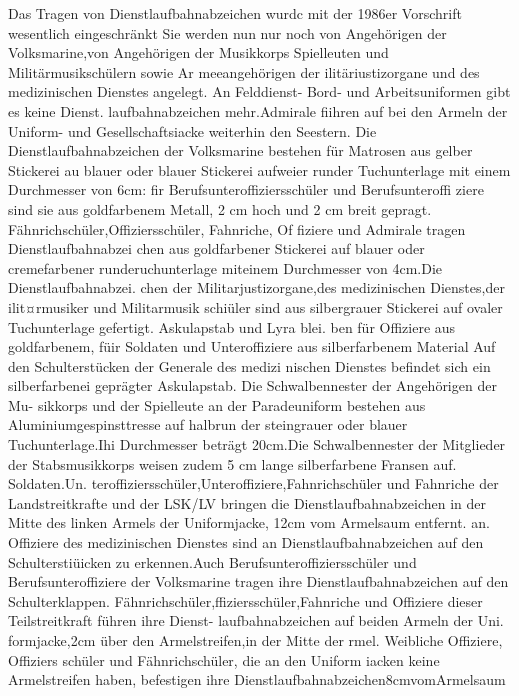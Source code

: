 Das Tragen von Dienstlaufbahnabzeichen wurdc
mit der 1986er Vorschrift wesentlich eingeschränkt
Sie werden nun nur noch von Angehörigen der
Volksmarine,von Angehörigen der Musikkorps
Spielleuten und Militärmusikschülern sowie Ar
meeangehörigen der ilitäriustizorgane und des
medizinischen Dienstes angelegt. An Felddienst-
Bord- und Arbeitsuniformen gibt es keine Dienst.
laufbahnabzeichen mehr.Admirale fiihren auf bei
den Armeln der Uniform- und Gesellschaftsiacke
weiterhin den Seestern.
Die Dienstlaufbahnabzeichen der Volksmarine
bestehen für Matrosen aus gelber Stickerei au
blauer oder blauer Stickerei aufweier runder
Tuchunterlage mit einem Durchmesser von 6cm:
fir Berufsunteroffiziersschüler und Berufsunteroffi
ziere sind sie aus goldfarbenem Metall, 2 cm hoch
und 2 cm breit gepragt.
Fähnrichschüler,Offiziersschüler, Fahnriche, Of
fiziere und Admirale tragen Dienstlaufbahnabzei
chen aus goldfarbener Stickerei auf blauer oder
cremefarbener runderuchunterlage miteinem
Durchmesser von 4cm.Die Dienstlaufbahnabzei.
chen der Militarjustizorgane,des medizinischen
Dienstes,der ilit¤rmusiker und Militarmusik
schiüler sind aus silbergrauer Stickerei auf ovaler
Tuchunterlage gefertigt. Askulapstab und Lyra blei.
ben für Offiziere aus goldfarbenem, füir Soldaten
und Unteroffiziere aus silberfarbenem Material
Auf den Schulterstücken der Generale des medizi
nischen Dienstes befindet sich ein silberfarbenei
geprägter Askulapstab.
Die Schwalbennester der Angehörigen der Mu-
sikkorps und der Spielleute an der Paradeuniform
bestehen aus Aluminiumgespinsttresse auf halbrun
der steingrauer oder blauer Tuchunterlage.Ihi
Durchmesser beträgt 20cm.Die Schwalbennester der Mitglieder der Stabsmusikkorps weisen zudem
5 cm lange silberfarbene Fransen auf. Soldaten.Un.
teroffiziersschüler,Unteroffiziere,Fahnrichschüler
und Fahnriche der Landstreitkrafte und der
LSK/LV bringen die Dienstlaufbahnabzeichen in
der Mitte des linken Armels der Uniformjacke,
12cm vom Armelsaum entfernt. an.
Offiziere des medizinischen Dienstes sind an
Dienstlaufbahnabzeichen auf den Schulterstiüicken
zu erkennen.Auch Berufsunteroffiziersschüler und
Berufsunteroffiziere der Volksmarine tragen ihre
Dienstlaufbahnabzeichen auf den Schulterklappen.
Fähnrichschüler,ffiziersschüler,Fahnriche und
Offiziere dieser Teilstreitkraft führen ihre Dienst-
laufbahnabzeichen auf beiden Armeln der Uni.
formjacke,2cm über den Armelstreifen,in der
Mitte der rmel. Weibliche Offiziere, Offiziers
schüler und Fähnrichschüler, die an den Uniform
iacken keine Armelstreifen haben, befestigen ihre
Dienstlaufbahnabzeichen8cmvomArmelsaum
